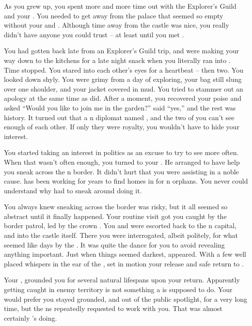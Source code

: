 \documentclass[char]{NeptuneBall}
\begin{document}
As you grew up, you spent more and more time out with the Explorer's Guild and your \cPlant{\uncle}. You needed to get away from the palace that seemed so empty without your \cQueen{\parent} and \cAriel{\sibling}. Although time away from the castle was nice, you really didn't have anyone you could trust -- at least until you met \emph{\cDiplomat{\them}}.

You had gotten back late from an Explorer's Guild trip, and were making your way down to the kitchens for a late night snack when you literally ran into \emph{\cDiplomat{\them}}. Time stopped. You stared into each other's eyes for a heartbeat -- then two. You looked down shyly. You were grimy from a day of exploring, your bag still slung over one shoulder, and your jacket covered in mud. You tried to stammer out an apology at the same time as \cDiplomat{\they} did. After a moment, you recovered your poise and asked ``Would you like to join me in the garden?'' \cDiplomat{\They} said ``yes,'' and the rest was history.  It turned out that \cDiplomat{\they} \cDiplomat{\were} a \pPacifica{}n diplomat named \cDiplomat{}, and the two of you can't see enough of each other. If only they were royalty, you wouldn't have to hide your interest.

You started taking an interest in politics as an excuse to try to see \cDiplomat{\them} more often. When that wasn't often enough, you turned to your \cPlant{\uncle}. He arranged to have \cPriest{} help you sneak across  the \pPacifica{}n border. It didn't hurt that you were assisting in a noble cause. \cPriest{} has been working for years to find homes in \pPacifica{} for \pAtlantis{}n orphans. You never could understand why \cPriest{\they} had to sneak around doing it.

You always knew sneaking across the border was risky, but it all seemed so abstract until it finally happened. Your routine visit got you caught by the border patrol, led by the crown \cPrince{\Prince} \cPrince{\themself}. You and \cPriest{} were escorted back to the \pPacifica{}n capital, and into the castle itself. There you were interrogated, albeit politely, for what seemed like days by the \cPrince{\prince}. It was quite the dance for you to avoid revealing anything important. Just when things seemed darkest, \cDiplomat{} appeared. With a few well placed whispers in the ear of the \cPrince{\Prince}, \cDiplomat{\they} set in motion your release and safe return to \pAtlantis{}.

Your \cKing{\parent}, \cKing{\King} \cKing{} grounded you for several natural lifespans upon your return. Apparently getting caught in enemy territory is not something a \cPrincess{\prince} is supposed to do. Your \cKing{\parent} would prefer you stayed grounded, and out of the public spotlight, for a very long time, but the \pPacifica{}ns repeatedly requested to work with you. That was almost certainly \cDiplomat{}'s doing. 
\end{document}
